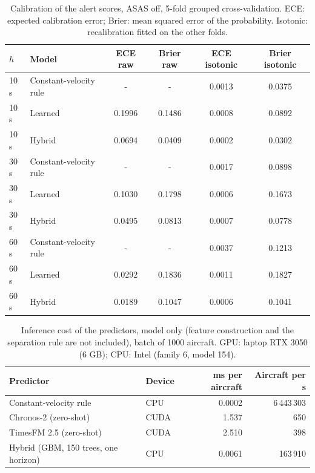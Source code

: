\begin{table}[t]
\centering\small
\caption{Calibration of the alert scores, ASAS off, 5-fold grouped cross-validation. ECE: expected calibration error; Brier: mean squared error of the probability. Isotonic: recalibration fitted on the other folds.}\label{tab:calib}
\begin{tabular}{llcccc}
\toprule
$h$ & Model & ECE raw & Brier raw & ECE isotonic & Brier isotonic \\
\midrule
10\,s & Constant-velocity rule & - & - & 0.0013 & 0.0375 \\
10\,s & Learned & 0.1996 & 0.1486 & 0.0008 & 0.0892 \\
10\,s & Hybrid & 0.0694 & 0.0409 & 0.0002 & 0.0302 \\
30\,s & Constant-velocity rule & - & - & 0.0017 & 0.0898 \\
30\,s & Learned & 0.1030 & 0.1798 & 0.0006 & 0.1673 \\
30\,s & Hybrid & 0.0495 & 0.0813 & 0.0007 & 0.0778 \\
60\,s & Constant-velocity rule & - & - & 0.0037 & 0.1213 \\
60\,s & Learned & 0.0292 & 0.1836 & 0.0011 & 0.1827 \\
60\,s & Hybrid & 0.0189 & 0.1047 & 0.0006 & 0.1041 \\
\bottomrule
\end{tabular}
\end{table}

\begin{table}[t]
\centering\small
\caption{Inference cost of the predictors, model only (feature construction and the separation rule are not included), batch of 1000 aircraft. GPU: laptop RTX 3050 (6 GB); CPU: Intel (family 6, model 154).}\label{tab:cost}
\begin{tabular}{llrr}
\toprule
Predictor & Device & ms per aircraft & Aircraft per s \\
\midrule
Constant-velocity rule & CPU & 0.0002 & 6\,443\,303 \\
Chronos-2 (zero-shot) & CUDA & 1.537 & 650 \\
TimesFM 2.5 (zero-shot) & CUDA & 2.510 & 398 \\
Hybrid (GBM, 150 trees, one horizon) & CPU & 0.0061 & 163\,910 \\
\bottomrule
\end{tabular}
\end{table}
